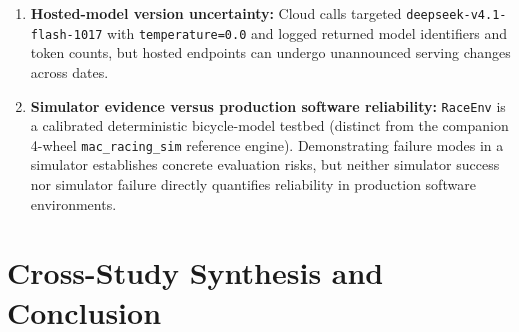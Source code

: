 \documentclass[11pt,a4paper]{article}
\begin{document}
\begin{enumerate}[leftmargin=1.5em,itemsep=2pt]
  \item \textbf{Hosted-model version uncertainty:} Cloud calls targeted \texttt{deepseek-v4.1-flash-1017} with \texttt{temperature=0.0} and logged returned model identifiers and token counts, but hosted endpoints can undergo unannounced serving changes across dates.
  \item \textbf{Simulator evidence versus production software reliability:} \texttt{RaceEnv} is a calibrated deterministic bicycle-model testbed (distinct from the companion 4-wheel \texttt{mac\_racing\_sim} reference engine). Demonstrating failure modes in a simulator establishes concrete evaluation risks, but neither simulator success nor simulator failure directly quantifies reliability in production software environments.
\end{enumerate}

\section{Cross-Study Synthesis and Conclusion}
\end{document}
